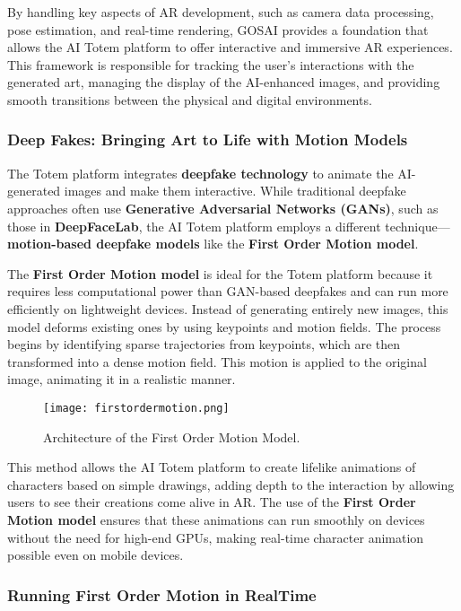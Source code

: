 By handling key aspects of AR development, such as camera data processing, pose estimation, and real-time rendering, GOSAI provides a foundation that allows the AI Totem platform to offer interactive and immersive AR experiences.
This framework is responsible for tracking the user's interactions with the generated art, managing the display of the AI-enhanced images, and providing smooth transitions between the physical and digital environments.

\subsubsection{ Deep Fakes: Bringing Art to Life with Motion Models}

The Totem platform integrates \textbf{deepfake technology} to animate the AI-generated images and make them interactive.
While traditional deepfake approaches often use \textbf{Generative Adversarial Networks (GANs)}, such as those in \textbf{DeepFaceLab}, the AI Totem platform employs a different technique—\textbf{motion-based deepfake models} like the \textbf{First Order Motion model}.

The \textbf{First Order Motion model} is ideal for the Totem platform because it requires less computational power than GAN-based deepfakes and can run more efficiently on lightweight devices.
Instead of generating entirely new images, this model deforms existing ones by using keypoints and motion fields. The process begins by identifying sparse trajectories from keypoints, which are then transformed into a dense motion field.
This motion is applied to the original image, animating it in a realistic manner.

\begin{figure}[h]
    \centering
    \texttt{[image: firstordermotion.png]}
    \caption{Architecture of the First Order Motion Model.}
    \vspace{0.1cm}
    \label{fig:firstorderarchitecture}
\end{figure}

This method allows the AI Totem platform to create lifelike animations of characters based on simple drawings, adding depth to the interaction by allowing users to see their creations come alive in AR.
The use of the \textbf{First Order Motion model} ensures that these animations can run smoothly on devices without the need for high-end GPUs, making real-time character animation possible even on mobile devices.

\subsubsection{Running First Order Motion in RealTime}

